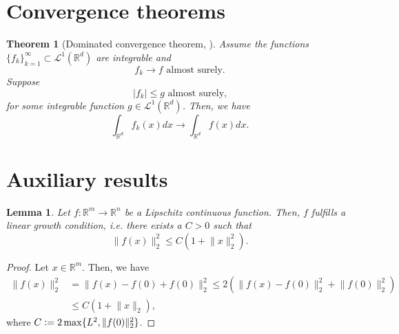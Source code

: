 \documentclass[12pt]{article}
\newtheorem{theorem}{Theorem}[section]
\newtheorem{lemma}[lemma]{Lemma}
\theoremstyle{definition}
\numberwithin{equation}{section}
\newcommand{\R}{\mathbb{R}}
\newcommand{\CL}{\mathcal{L}}
\newcommand{\norm}[1]{\lVert{#1}\rVert_2}
\newcommand{\defeq}{\vcentcolon=}
\begin{document}
\section{Convergence theorems}
\begin{theorem}[Dominated convergence theorem, ]
  \label{thm:dominated_convergence}
  Assume the functions $\{f_k\}_{k=1}^{\infty} \subset \CL^1(\R^d)$ are integrable and
  \begin{equation*}
    f_k \rightarrow f \text{ almost surely.}
  \end{equation*}
  Suppose
  \begin{equation*}
    |f_k| \leq g \text{ almost surely,}
  \end{equation*}
  for some integrable function $g \in \CL^1(\R^d)$. Then, we have
  \begin{equation*}
    \int_{\R^d} f_k(x) dx \rightarrow \int_{\R^d} f(x) dx.
  \end{equation*}
\end{theorem}
\section{Auxiliary results}
\begin{lemma}
  \label{lemma:linear_growth}
  Let $f : \R^m \rightarrow \R^n$ be a Lipschitz continuous function. Then, $f$ fulfills a linear growth condition, i.e. there exists a $C > 0$ such that 
  \begin{equation*}
    \norm{f(x)}^2 \leq C (1 + \norm{x}^2).
  \end{equation*}
\end{lemma}
\begin{proof}
  Let $x \in \R^m$. Then, we have
  \begin{align*}
    \norm{f(x)}^2 &= \norm{f(x) - f(0) + f(0)}^2 \leq 2 \left( \norm{f(x) - f(0)}^2 + \norm{f(0)}^2\right) \\
    &\leq C(1+\norm{x}),
  \end{align*}
  where $C \defeq 2\max\{L^2, \norm{f(0)}^2\}$.
\end{proof}
\end{document}

